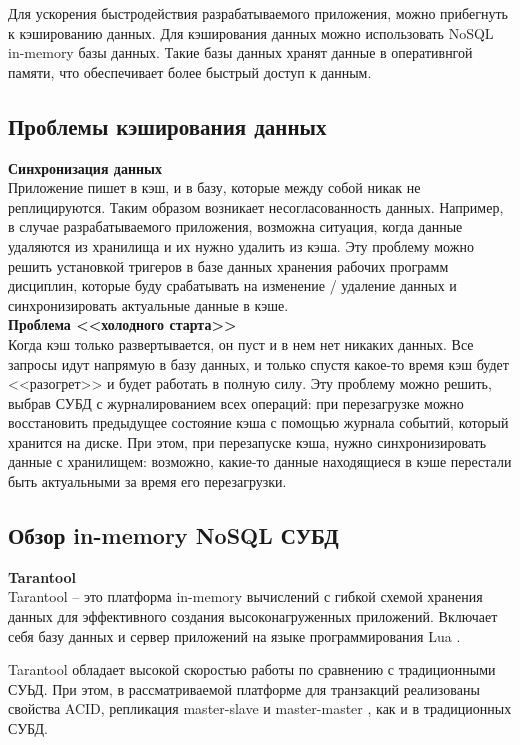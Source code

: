 Для ускорения быстродействия разрабатываемого приложения, можно прибегнуть к кэшированию данных. Для кэширования данных можно  использовать NoSQL \cite{nosql} in-memory базы данных. Такие базы данных хранят данные в оперативнгой памяти, что обеспечивает более быстрый доступ к данным.

\subsection{Проблемы кэширования данных}

\noindent\textbf{Синхронизация данных}\\

Приложение пишет в кэш, и в базу, которые между собой никак не реплицируются. Таким образом возникает несогласованность данных. Например, в случае разрабатываемого приложения, возможна ситуация, когда данные удаляются из хранилища и их нужно удалить из
кэша. Эту проблему можно решить установкой тригеров в базе данных хранения рабочих программ дисциплин, которые буду срабатывать на изменение / удаление данных и синхронизировать актуальные данные в кэше.\\

\noindent\textbf{Проблема <<холодного старта>>}\\

Когда кэш только развертывается, он пуст и в нем нет никаких данных. Все запросы идут напрямую в базу данных, и только спустя какое-то время кэш будет <<разогрет>> и будет работать в полную силу. Эту проблему можно решить, выбрав СУБД с журналированием всех операций: при перезагрузке можно восстановить предыдущее состояние кэша с помощью журнала событий, который хранится на диске. При этом, при перезапуске кэша, нужно синхронизировать данные с хранилищем: возможно, какие-то данные находящиеся в кэше перестали быть актуальными за время его перезагрузки.

\subsection{Обзор in-memory NoSQL СУБД}

\noindent\textbf{Tarantool}\\

Tarantool \cite{tarantool} -- это платформа in-memory вычислений с гибкой схемой хранения данных для эффективного создания высоконагруженных приложений. Включает себя базу данных и сервер приложений на языке программирования Lua \cite{lua}.

Tarantool обладает высокой скоростью работы по сравнению с традиционными СУЬД.  При этом, в рассматриваемой платформе для транзакций реализованы свойства ACID, репликация master-slave \cite{master-slave} и master-master \cite{master-master}, как и в традиционных СУБД.

